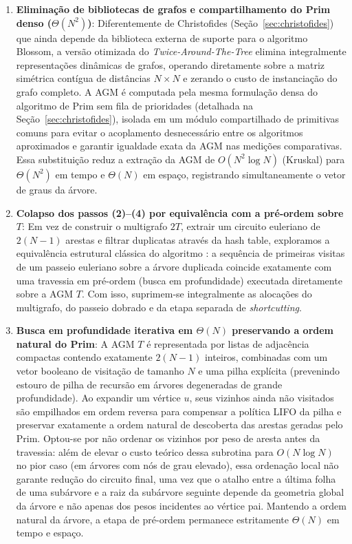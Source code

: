 \begin{enumerate}
  \item \textbf{Eliminação de bibliotecas de grafos e compartilhamento do Prim denso
  ($\Theta(N^2)$)}: Diferentemente de Christofides (Seção~\ref{sec:christofides}) que
  ainda depende da biblioteca externa de suporte para o algoritmo Blossom, a versão otimizada
  do \textit{Twice-Around-The-Tree} elimina integralmente representações dinâmicas de grafos, operando diretamente sobre a matriz
  simétrica contígua de distâncias $N \times N$ e zerando o custo de instanciação do grafo
  completo. A AGM é computada pela mesma formulação densa do algoritmo de Prim sem fila de
  prioridades (detalhada na Seção~\ref{sec:christofides}), isolada em um módulo compartilhado
  de primitivas comuns para evitar o acoplamento desnecessário entre os algoritmos aproximados e
  garantir igualdade exata da AGM nas medições comparativas. Essa substituição reduz a extração
  da AGM de $O(N^2 \log N)$ (Kruskal) para $\Theta(N^2)$ em tempo e $\Theta(N)$ em
  espaço, registrando simultaneamente o vetor de graus da árvore.

  \item \textbf{Colapso dos passos (2)--(4) por equivalência com a pré-ordem sobre $T$}: Em
  vez de construir o multigrafo $2T$, extrair um circuito euleriano de $2(N - 1)$ arestas e
  filtrar duplicatas através da hash table, exploramos a equivalência estrutural clássica do
  algoritmo \cite{cormen2009clrs}: a sequência de primeiras visitas de um passeio euleriano
  sobre a árvore duplicada coincide exatamente com uma travessia em pré-ordem (busca em
  profundidade) executada diretamente sobre a AGM $T$. Com isso, suprimem-se integralmente as
  alocações do multigrafo, do passeio dobrado e da etapa separada de \textit{shortcutting}.

  \item \textbf{Busca em profundidade iterativa em $\Theta(N)$ preservando a ordem natural do
  Prim}: A AGM $T$ é representada por listas de adjacência compactas contendo exatamente
  $2(N - 1)$ inteiros, combinadas com um vetor booleano de visitação de tamanho $N$ e uma pilha
  explícita (prevenindo estouro de pilha de recursão em árvores degeneradas de grande
  profundidade). Ao expandir um vértice $u$, seus vizinhos ainda não visitados são empilhados
  em ordem reversa para compensar a política LIFO da pilha e preservar exatamente a ordem
  natural de descoberta das arestas geradas pelo Prim. Optou-se por não ordenar
  os vizinhos por peso de aresta antes da travessia: além de elevar o custo teórico dessa
  subrotina para $O(N \log N)$ no pior caso (em árvores com nós de grau elevado), essa ordenação
  local não garante redução do circuito final, uma vez que o atalho entre a última
  folha de uma subárvore e a raiz da subárvore seguinte depende da geometria global da árvore e não apenas
  dos pesos incidentes ao vértice pai. Mantendo a ordem natural da árvore, a etapa de pré-ordem
  permanece estritamente $\Theta(N)$ em tempo e espaço.
\end{enumerate}

